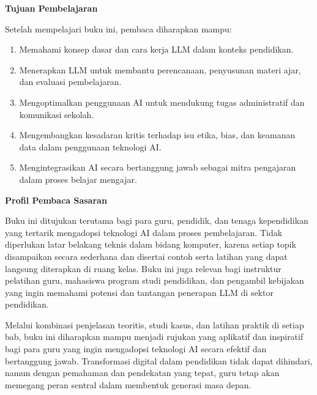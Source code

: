 \vspace{1em}
\noindent \textbf{Tujuan Pembelajaran}

Setelah mempelajari buku ini, pembaca diharapkan mampu:
\begin{enumerate}
	\item Memahami konsep dasar dan cara kerja LLM dalam konteks pendidikan.
	\item Menerapkan LLM untuk membantu perencanaan, penyusunan materi ajar, dan evaluasi pembelajaran.
	\item Mengoptimalkan penggunaan AI untuk mendukung tugas administratif dan komunikasi sekolah.
	\item Mengembangkan kesadaran kritis terhadap isu etika, bias, dan keamanan data dalam penggunaan teknologi AI.
	\item Mengintegrasikan AI secara bertanggung jawab sebagai mitra pengajaran dalam proses belajar mengajar.
\end{enumerate}

\vspace{1em}
\noindent \textbf{Profil Pembaca Sasaran}

Buku ini ditujukan terutama bagi para guru, pendidik, dan tenaga kependidikan yang tertarik mengadopsi teknologi AI dalam proses pembelajaran. Tidak diperlukan latar belakang teknis dalam bidang komputer, karena setiap topik disampaikan secara sederhana dan disertai contoh serta latihan yang dapat langsung diterapkan di ruang kelas. Buku ini juga relevan bagi instruktur pelatihan guru, mahasiswa program studi pendidikan, dan pengambil kebijakan yang ingin memahami potensi dan tantangan penerapan LLM di sektor pendidikan.

Melalui kombinasi penjelasan teoritis, studi kasus, dan latihan praktik di setiap bab, buku ini diharapkan mampu menjadi rujukan yang aplikatif dan inspiratif bagi para guru yang ingin mengadopsi teknologi AI secara efektif dan bertanggung jawab. Transformasi digital dalam pendidikan tidak dapat dihindari, namun dengan pemahaman dan pendekatan yang tepat, guru tetap akan memegang peran sentral dalam membentuk generasi masa depan.
